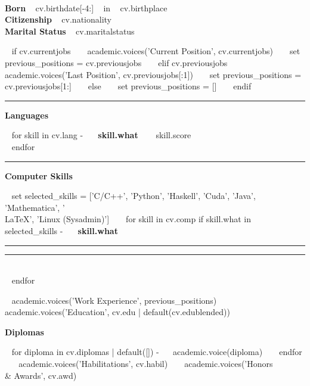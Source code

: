 \documentclass[a4paper]{article}
\newcommand{\crule}[3][black]{\textcolor{#1}{\rule{#2}{#3}}}
\newcommand{\progbar}[4][black]{\crule[#1]{#3}{#4}\crule[#1!10!white!90]{#2}{#4}}
\newcommand{\block}[1]{\hrule \vspace{0.2cm} \textbf{\Large #1} \vspace{0.2cm}}
\newcommand{\blockNp}[1]{\newpage \textbf{\Large #1} \vspace{0.2cm}}
\newcommand{\skill}[2]{\textbf{#1} \hfill #2 \\}
\newcommand{\skillbar}[4]{\textbf{#1} \hfill \progbar{#2}{#3}{#4} \\}
\begin{document}
	\vfill

	\tableofcontents

	\vfill

	\clearpage

	\begin{minipage}[c]{0.6\columnwidth}
		\\
	\end{minipage}
	\hfill
	\begin{minipage}[t]{0.37\columnwidth}
		\skill{Born}{~{{ cv.birthdate[-4:] }}~ in ~{{ cv.birthplace }}~ }
		\skill{Citizenship}{~{{ cv.nationality }}~ }
		\skill{Marital Status}{~{{ cv.maritalstatus }}~}
	\end{minipage}
	\vspace{-0.25em}

	\begin{minipage}[t]{0.6\columnwidth}
~{ if cv.currentjobs }~
~{{ academic.voices('Current Position', cv.currentjobs) }}~
~{ set previous_positions = cv.previousjobs }~
~{ elif cv.previousjobs }~
~{{ academic.voices('Last Position', cv.previousjobs[:1]) }}~
~{ set previous_positions = cv.previousjobs[1:] }~
~{ else }~
~{ set previous_positions = [] }~
~{ endif }~
	\end{minipage}
	\hfill
	\begin{minipage}[t]{0.375\columnwidth}
		\block{Languages}

~{ for skill in cv.lang -}~
		\skill{~{{ skill.what }}~}{~{{ skill.score }}~}
~{ endfor }~
		\block{Computer Skills}

~{ set selected_skills = ['C/C++', 'Python', 'Haskell', 'Cuda', 'Java', 'Mathematica', '\\LaTeX', 'Linux (Sysadmin)'] }~
~{ for skill in cv.comp if skill.what in selected_skills -}~
		\skillbar{~{{ skill.what }}~}
			{~{{ 2 - skill.score * 2 }}~cm}
			{~{{ skill.score * 2 }}~cm}
			{0.25cm}
~{ endfor }~
	\end{minipage}


~{{ academic.voices('Work Experience', previous_positions) }}~
~{{ academic.voices('Education', cv.edu | default(cv.edublended)) }}~

	\blockNp{Diplomas}

~{ for diploma in cv.diplomas | default([]) -}~
~{{ academic.voice(diploma) }}~
~{ endfor }~
~{{ academic.voices('Habilitations', cv.habil) }}~
~{{ academic.voices('Honors \\& Awards', cv.awd) }}~
\end{document}
